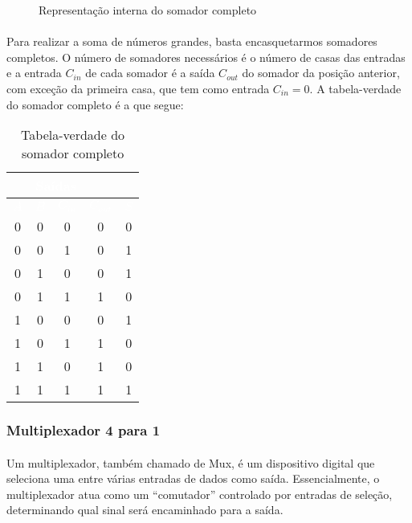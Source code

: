 \documentclass[a4paper,12pt]{article}
\begin{document}
\begin{figure}[H]
    \centering
    
    \caption{Representação interna do somador completo}
    \label{fig:somador_interna}
\end{figure}

\newpage

\paragraph{}
Para realizar a soma de números grandes, basta encasquetarmos somadores completos. O número de somadores necessários é o número de casas das entradas e a entrada $C_{in}$ de cada somador é a saída $C_{out}$ do somador da posição anterior, com exceção da primeira casa, que tem como entrada $C_{in} = 0$. A tabela-verdade do somador completo é a que segue:

\begin{table}[H]
    \centering
    \begin{tabular}{|c|c|c|c|c|}
        \hline
        \rowcolor{black}
        \multicolumn{3}{|c|}{\textbf{\textcolor{white}{Entradas}}} & \multicolumn{2}{|c|}{\textbf{\textcolor{white}{Saídas}}} \\ \hline
        \rowcolor{black}
        \textcolor{white}{$A$} & \textcolor{white}{$B$} & \textcolor{white}{$C_{in}$} & \textcolor{white}{$C_{out}$} & \textcolor{white}{$S$} \\ \hline
        0 & 0 & 0 & 0 & 0 \\ \hline
        \rowcolor{cinza}
        0 & 0 & 1 & 0 & 1 \\ \hline
        0 & 1 & 0 & 0 & 1 \\ \hline
        \rowcolor{cinza}
        0 & 1 & 1 & 1 & 0 \\ \hline
        1 & 0 & 0 & 0 & 1 \\ \hline
        \rowcolor{cinza}
        1 & 0 & 1 & 1 & 0 \\ \hline
        1 & 1 & 0 & 1 & 0 \\ \hline
        \rowcolor{cinza}
        1 & 1 & 1 & 1 & 1 \\ \hline
    \end{tabular}
    \caption{Tabela-verdade do somador completo}
\end{table}

\subsubsection{Multiplexador 4 para 1}
\paragraph{}
Um multiplexador, também chamado de Mux, é um dispositivo digital que seleciona uma entre várias entradas de dados como saída. Essencialmente, o multiplexador atua como um ``comutador'' controlado por entradas de seleção, determinando qual sinal será encaminhado para a saída.
\end{document}
